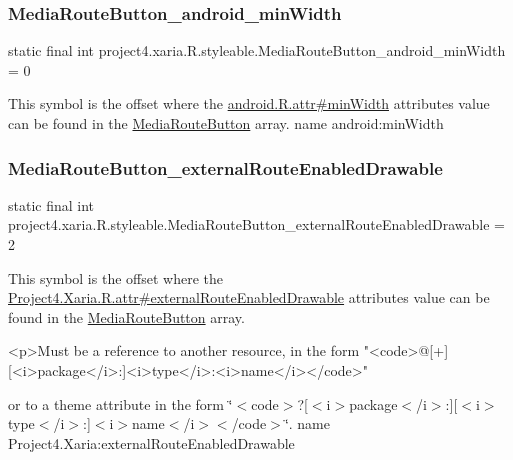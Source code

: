 \subsubsection{\texorpdfstring{Media\+Route\+Button\+\_\+android\+\_\+min\+Width}{MediaRouteButton\_android\_minWidth}}
{\footnotesize\ttfamily static final int project4.\+xaria.\+R.\+styleable.\+Media\+Route\+Button\+\_\+android\+\_\+min\+Width = 0\hspace{0.3cm}{\ttfamily [static]}}

This symbol is the offset where the \hyperlink{}{android.\+R.\+attr\#min\+Width} attribute\textquotesingle{}s value can be found in the \hyperlink{classproject4_1_1xaria_1_1R_1_1styleable_afbc7b05aea080f3e7e5fb4051290a14d}{Media\+Route\+Button} array.  name android\+:min\+Width \mbox{\label{classproject4_1_1xaria_1_1R_1_1styleable_a91bce24bc490f2bcbffa0eb9d2c6e8f4}} 
\subsubsection{\texorpdfstring{Media\+Route\+Button\+\_\+external\+Route\+Enabled\+Drawable}{MediaRouteButton\_externalRouteEnabledDrawable}}
{\footnotesize\ttfamily static final int project4.\+xaria.\+R.\+styleable.\+Media\+Route\+Button\+\_\+external\+Route\+Enabled\+Drawable = 2\hspace{0.3cm}{\ttfamily [static]}}

This symbol is the offset where the \hyperlink{}{Project4.\+Xaria.\+R.\+attr\#external\+Route\+Enabled\+Drawable} attribute\textquotesingle{}s value can be found in the \hyperlink{classproject4_1_1xaria_1_1R_1_1styleable_afbc7b05aea080f3e7e5fb4051290a14d}{Media\+Route\+Button} array.

\begin{DoxyVerb}      <p>Must be a reference to another resource, in the form "<code>@[+][<i>package</i>:]<i>type</i>:<i>name</i></code>"
\end{DoxyVerb}
 or to a theme attribute in the form \char`\"{}$<$code$>$?\mbox{[}$<$i$>$package$<$/i$>$\+:\mbox{]}\mbox{[}$<$i$>$type$<$/i$>$\+:\mbox{]}$<$i$>$name$<$/i$>$$<$/code$>$\char`\"{}.  name Project4.\+Xaria\+:external\+Route\+Enabled\+Drawable \mbox{\label{classproject4_1_1xaria_1_1R_1_1styleable_ae48043cd359a2d376fa65b4af13eca9a}} 
